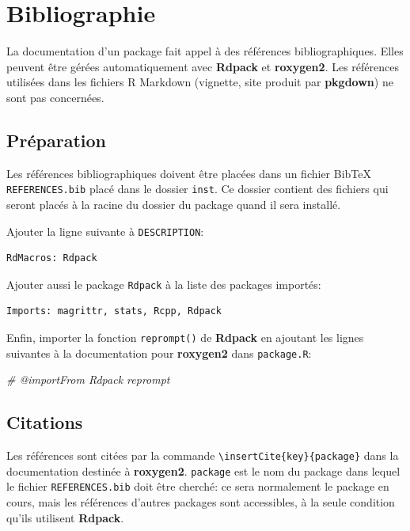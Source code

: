 \documentclass[
  12pt,
  french,
  a4paper,
  extrafontsizes,onecolumn,openright
  ]{memoir}
\newenvironment{Shaded}{\begin{snugshade}}{\end{snugshade}}
\newcommand{\CommentTok}[1]{\textcolor[rgb]{0.56,0.35,0.01}{\textit{#1}}}
\begin{document}
\section{Bibliographie}\label{bibliographie-1}

La documentation d'un package fait appel à des références bibliographiques.
Elles peuvent être gérées automatiquement avec \textbf{Rdpack} et \textbf{roxygen2}.
Les références utilisées dans les fichiers R Markdown (vignette, site produit par \textbf{pkgdown}) ne sont pas concernées.

\subsection{Préparation}\label{pruxe9paration}

Les références bibliographiques doivent être placées dans un fichier BibTeX \texttt{REFERENCES.bib} placé dans le dossier \texttt{inst}.
Ce dossier contient des fichiers qui seront placés à la racine du dossier du package quand il sera installé.

Ajouter la ligne suivante à \texttt{DESCRIPTION}:

\begin{verbatim}
RdMacros: Rdpack
\end{verbatim}

Ajouter aussi le package \texttt{Rdpack} à la liste des packages importés:

\begin{verbatim}
Imports: magrittr, stats, Rcpp, Rdpack
\end{verbatim}

Enfin, importer la fonction \texttt{reprompt()} de \textbf{Rdpack} en ajoutant les lignes suivantes à la documentation pour \textbf{roxygen2} dans \texttt{package.R}:

\scriptsize

\begin{Shaded}
\begin{Highlighting}[]
\CommentTok{\#\textquotesingle{} @importFrom Rdpack reprompt}
\end{Highlighting}
\end{Shaded}

\normalsize

\subsection{Citations}\label{citations}

Les références sont citées par la commande \texttt{\textbackslash{}insertCite\{key\}\{package\}} dans la documentation destinée à \textbf{roxygen2}.
\texttt{package} est le nom du package dans lequel le fichier \texttt{REFERENCES.bib} doit être cherché: ce sera normalement le package en cours, mais les références d'autres packages sont accessibles, à la seule condition qu'ils utilisent \textbf{Rdpack}.
\end{document}
